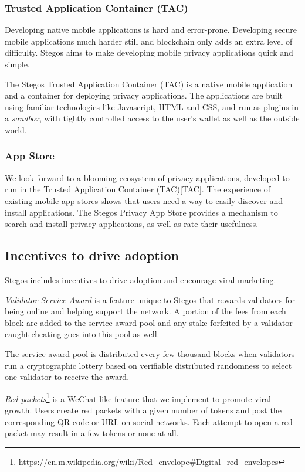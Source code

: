 \documentclass[a4paper, 10pt, conference]{ieeeconf}
\begin{document}
\subsubsection{Trusted Application Container (TAC)}
Developing native mobile applications is hard and error-prone. Developing secure mobile applications much harder still and blockchain only adds an extra level of difficulty. Stegos aims to make developing mobile privacy applications quick and simple. 

The Stegos Trusted Application Container (TAC) is a native mobile application and a container for deploying privacy applications. The applications are built using familiar technologies like Javascript, HTML and CSS, and run as plugins in a \textit{sandbox}, with tightly controlled access to the user's wallet as well as the outside world.

\subsubsection{App Store}
We look forward to a blooming ecosystem of privacy applications, developed to run in the Trusted Application Container (TAC)\ref{TAC}. The experience of existing mobile app stores shows that users need a way to easily discover and install applications. The Stegos Privacy App Store provides a mechanism to search and install privacy applications, as well as rate their usefulness. 

\subsection{Incentives to drive adoption}
Stegos includes incentives to drive adoption and encourage viral marketing. 

\textit{Validator Service Award} is a feature unique to Stegos that rewards validators for being online and helping support the network. A portion of the fees from each block are added to the service award pool and any stake forfeited by a validator caught cheating goes into this pool as well. 

The service award pool is distributed every few thousand blocks when validators run a cryptographic lottery based on verifiable distributed randomness to select one validator to receive the award.

\textit{Red packets}\footnote{https://en.m.wikipedia.org/wiki/Red\_envelope\#Digital\_red\_envelopes} is a WeChat-like feature that we implement to promote viral growth. Users create red packets with a given number of tokens and post the corresponding QR code or URL on social networks. Each attempt to open a red packet may result in a few tokens or none at all. 
\end{document}
